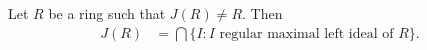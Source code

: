 %
%	

%

%

\begin{theorem}
	\label{thm:J(R)}
	Let $R$ be a ring such that $J(R)\ne R$. Then 
	\begin{align*}
		J(R)&=\bigcap\{I:\text{$I$ regular maximal left ideal of $R$}\}.
	\end{align*}
\end{theorem}

